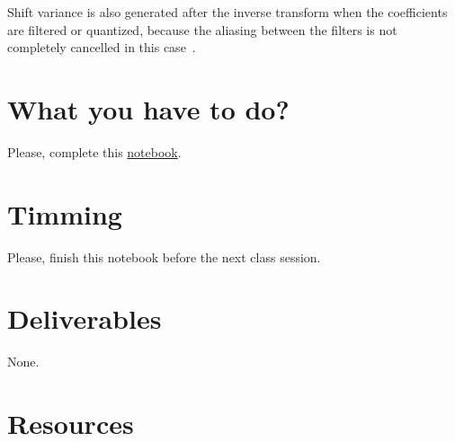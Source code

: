Shift variance is also generated after the inverse transform when the
coefficients are filtered or quantized, because the aliasing between
the filters is not completely cancelled in this
case~\cite{bradley2003shift}.

\section{What you have to do?}
  
Please, complete this
\href{https://github.com/Sistemas-Multimedia/Sistemas-Multimedia.github.io/blob/master/study_guide/MDWT/MDWT.ipynb}{notebook}.

\section{Timming}

Please, finish this notebook before the next class session.

\section{Deliverables}

None.

\section{Resources}



